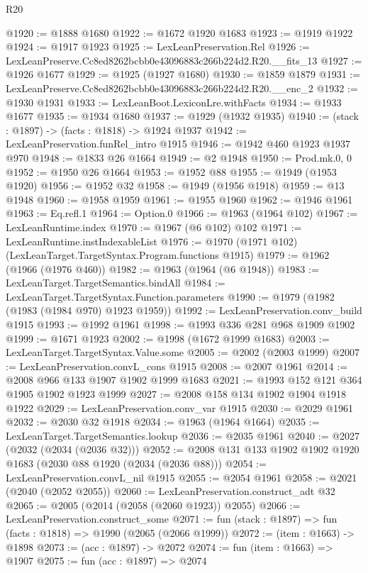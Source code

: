 \begin{lexlean}{R20}
\begin{coremodule}
@1920 := @1888 @1680
@1922 := @1672 @1920 @1683
@1923 := @1919 @1922
@1924 := @1917 @1923
@1925 := LexLeanPreservation.Rel
@1926 := LexLeanPreserve.Cc8ed8262bcbb0e43096883c266b224d2.R20.__fits_13
@1927 := @1926 @1677
@1929 := @1925 (@1927 @1680)
@1930 := @1859 @1879
@1931 := LexLeanPreserve.Cc8ed8262bcbb0e43096883c266b224d2.R20.__enc_2
@1932 := @1930 @1931
@1933 := LexLeanBoot.LexiconLre.withFacts
@1934 := @1933 @1677
@1935 := @1934 @1680
@1937 := @1929 (@1932 @1935)
@1940 := (stack : @1897) -> (facts : @1818) -> @1924 @1937
@1942 := LexLeanPreservation.funRel_intro @1915
@1946 := @1942 @460 @1923 @1937 @970
@1948 := @1833 @26 @1664
@1949 := @2 @1948
@1950 := Prod.mk.{0, 0}
@1952 := @1950 @26 @1664
@1953 := @1952 @88
@1955 := @1949 (@1953 @1920)
@1956 := @1952 @32
@1958 := @1949 (@1956 @1918)
@1959 := @13 @1948
@1960 := @1958 @1959
@1961 := @1955 @1960
@1962 := @1946 @1961
@1963 := Eq.refl.{1}
@1964 := Option.{0}
@1966 := @1963 (@1964 @102)
@1967 := LexLeanRuntime.index
@1970 := @1967 (@6 @102) @102
@1971 := LexLeanRuntime.instIndexableList
@1976 := @1970 (@1971 @102) (LexLeanTarget.TargetSyntax.Program.functions @1915)
@1979 := @1962 (@1966 (@1976 @460))
@1982 := @1963 (@1964 (@6 @1948))
@1983 := LexLeanTarget.TargetSemantics.bindAll
@1984 := LexLeanTarget.TargetSyntax.Function.parameters
@1990 := @1979 (@1982 (@1983 (@1984 @970) @1923 @1959))
@1992 := LexLeanPreservation.conv_build @1915
@1993 := @1992 @1961
@1998 := @1993 @336 @281 @968 @1909 @1902
@1999 := @1671 @1923
@2002 := @1998 (@1672 @1999 @1683)
@2003 := LexLeanTarget.TargetSyntax.Value.some
@2005 := @2002 (@2003 @1999)
@2007 := LexLeanPreservation.convL_cons @1915
@2008 := @2007 @1961
@2014 := @2008 @966 @133 @1907 @1902 @1999 @1683
@2021 := @1993 @152 @121 @364 @1905 @1902 @1923 @1999
@2027 := @2008 @158 @134 @1902 @1904 @1918 @1922
@2029 := LexLeanPreservation.conv_var @1915
@2030 := @2029 @1961
@2032 := @2030 @32 @1918
@2034 := @1963 (@1964 @1664)
@2035 := LexLeanTarget.TargetSemantics.lookup
@2036 := @2035 @1961
@2040 := @2027 (@2032 (@2034 (@2036 @32)))
@2052 := @2008 @131 @133 @1902 @1902 @1920 @1683 (@2030 @88 @1920 (@2034 (@2036 @88)))
@2054 := LexLeanPreservation.convL_nil @1915
@2055 := @2054 @1961
@2058 := @2021 (@2040 (@2052 @2055))
@2060 := LexLeanPreservation.construct_adt @32
@2065 := @2005 (@2014 (@2058 (@2060 @1923)) @2055)
@2066 := LexLeanPreservation.construct_some
@2071 := fun (stack : @1897) => fun (facts : @1818) => @1990 (@2065 (@2066 @1999))
@2072 := (item : @1663) -> @1898
@2073 := (acc : @1897) -> @2072
@2074 := fun (item : @1663) => @1907
@2075 := fun (acc : @1897) => @2074

\end{coremodule}
\end{lexlean}
